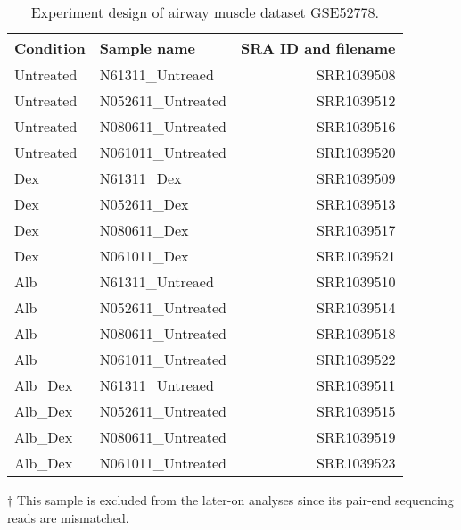 \begin{table}[!htbp]
    \caption[Experiment design of airway muscle dataset GSE52778]{
        Experiment design of airway muscle dataset GSE52778.
    }
    \label{tab:dataset-airway}
    \centering
    \begin{threeparttable}
        \begin{tabular}{llr}
            \toprule
            Condition & Sample name & SRA ID and filename \\
            \midrule
            Untreated & N61311\_Untreaed                    & SRR1039508 \\
            Untreated & N052611\_Untreated                  & SRR1039512 \\
            Untreated & N080611\_Untreated                  & SRR1039516 \\
            Untreated & N061011\_Untreated                  & SRR1039520 \\

            Dex       & N61311\_Dex                         & SRR1039509 \\
            Dex       & N052611\_Dex                        & SRR1039513 \\
            Dex       & N080611\_Dex                        & SRR1039517 \\
            Dex       & N061011\_Dex                        & SRR1039521 \\

            Alb       & N61311\_Untreaed                    & SRR1039510 \\
            Alb       & N052611\_Untreated                  & SRR1039514 \\
            Alb       & N080611\_Untreated                  & SRR1039518 \\
            Alb       & N061011\_Untreated                  & SRR1039522 \\

            Alb\_Dex  & N61311\_Untreaed                    & SRR1039511 \\
            Alb\_Dex  & N052611\_Untreated\tnote{$\dagger$} & SRR1039515\tnote{$\dagger$} \\
            Alb\_Dex  & N080611\_Untreated                  & SRR1039519 \\
            Alb\_Dex  & N061011\_Untreated                  & SRR1039523 \\
            \bottomrule
        \end{tabular}
        \begin{tablenotes}
        \item[$\dagger$] This sample is excluded from the later-on analyses
            since its pair-end sequencing reads are mismatched.
        \end{tablenotes}
    \end{threeparttable}
\end{table}
